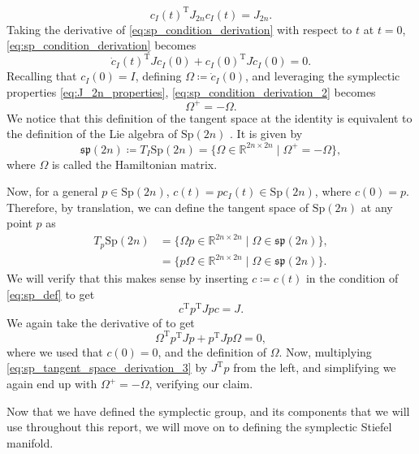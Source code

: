%
\begin{equation}\label{eq:sp_condition_derivation}
c_{I}(t)^{\mathrm{T}}J_{2n}c_{I}(t)=J_{2n}.
\end{equation}
%
Taking the derivative of \eqref{eq:sp_condition_derivation} with respect to $t$ at $t=0$, \eqref{eq:sp_condition_derivation} becomes 
%
\begin{equation}\label{eq:sp_condition_derivation_2}
\dot{c}_{I}(t)^{\mathrm{T}}Jc_{I}(0)+c_{I}(0)^{\mathrm{T}}J \dot{c}_{I}(0)=0.
\end{equation}
%
Recalling that $c_{I}(0)=I$, defining $\Omega \coloneqq \dot{c}_{I}(0)$, and leveraging the symplectic properties \eqref{eq:J_2n_properties}, \eqref{eq:sp_condition_derivation_2} becomes
%
\begin{equation*}
\Omega^{+}=-\Omega.
\end{equation*}
%
We notice that this definition of the tangent space at the identity is equivalent to the definition of the Lie algebra of $\mathrm{Sp}(2n)$ \cite[p.~3]{BendokatZimmermann2021}. It is given by 
%
\begin{equation}\label{eq:sp_Lie_algebra}
    \mathfrak{sp}(2n)\coloneqq T_{I}\mathrm{Sp}(2n)=\{\Omega\in \mathbb{R}^{2n\times2n} \;|\; \Omega^{+}=-\Omega\},
\end{equation}
%
where $\Omega$ is called the Hamiltonian matrix. 

Now, for a general $p \in \mathrm{Sp}(2n)$, $c(t)=pc_{I}(t)\in \mathrm{Sp}(2n)$, where $c(0)=p$. Therefore, by translation, we can define the tangent space of $\mathrm{Sp}(2n)$ at any point $p$  as
%
\begin{equation}\label{eq:sp_tangent_space}
\begin{split}
T_{p}\mathrm{Sp}(2n)&=\{\Omega p\in \mathbb{R}^{2n\times2n} \;|\; \Omega\in\mathfrak{sp}(2n)\},\\
&=\{ p\Omega\in \mathbb{R}^{2n\times2n} \;|\; \Omega\in\mathfrak{sp}(2n)\}.
\end{split}
\end{equation}
%
We will verify that this makes sense by inserting $c\coloneqq c(t)$ in the condition of \eqref{eq:sp_def} to get
%
\begin{equation*}
c^{\mathrm{T}}p^{\mathrm{T}}Jpc=J.
\end{equation*}
%
We again take the derivative of to get
%
\begin{equation}\label{eq:sp_tangent_space_derivation_3}
\Omega ^{\mathrm{T}}p^{\mathrm{T}}Jp+p^{\mathrm{T}}Jp\Omega=0,
\end{equation}
where we used that $c(0)=0$, and the definition of $\Omega$. Now, multiplying \eqref{eq:sp_tangent_space_derivation_3} by $J^{\mathrm{T}}p$ from the left, and simplifying we again end up with $\Omega^{+}=-\Omega$, verifying our claim.

Now that we have defined the symplectic group, and its components that we will use throughout this report, we will move on to defining the symplectic Stiefel manifold.
